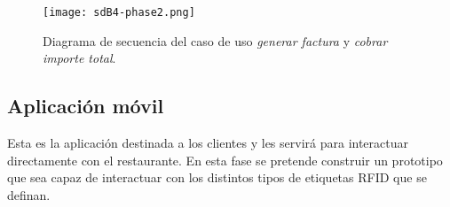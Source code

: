 \begin{itemize}
  \begin{sidewaysfigure}[!h]
    \begin{center}
      \texttt{[image: sdB4-phase2.png]}
      \caption{Diagrama de secuencia del caso de uso \emph{generar factura}
      y \emph{cobrar importe total}.}
      \label{fig:sdB4-phase2}
    \end{center}
  \end{sidewaysfigure}
\end{itemize}


\subsection{Aplicación móvil}
Esta es la aplicación destinada a los clientes y les servirá para interactuar
directamente con el restaurante. En esta fase se pretende construir un
prototipo que sea capaz de interactuar con los distintos
tipos de etiquetas \acs{RFID} que se definan.

